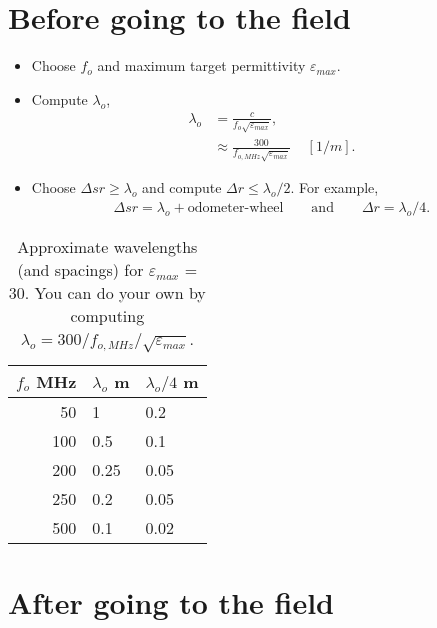 \documentclass[a4paper,12pt]{article}
\begin{document}
\section*{Before going to the field}
\begin{itemize}
\item Choose $f_o$ and maximum target permittivity $\varepsilon_{max}$.
\item Compute $\lambda_o$,
 \begin{align}
\lambda_o &= \frac{c}{f_o\sqrt{\varepsilon_{max}}},\\
 &\approx \frac{300}{f_{o,MHz}\sqrt{\varepsilon_{max}}} \;\;\;\; [1/m].
\end{align}
\item Choose $\Delta sr \geq \lambda_o$ and compute $\Delta r \leq \lambda_o/2$. For example, 
\begin{align*}
\Delta sr=\lambda_o+\text{odometer-wheel}
\hspace{2em} \text{and} \hspace{2em}
\Delta r = \lambda_o/4.
\end{align*}
\end{itemize}
%
\begin{table}[!h]
\centering
\begin{tabular}{ r | l | l}
$f_o$ MHz & $\lambda_o$ m & $\lambda_o/4$ m \\
\hline
50 & 1 & 0.2 \\
100 & 0.5 & 0.1 \\
200 & 0.25 & 0.05 \\
250 & 0.2 & 0.05 \\
500 & 0.1 & 0.02 \\
\hline
\end{tabular}
\caption{Approximate wavelengths (and spacings) for $\varepsilon_{max}$ = 30. You can do your own by computing $\lambda_o=300/f_{o,MHz}/\sqrt{\varepsilon_{max}}$.}
 \label{tbl:wavelength}
\end{table}
\section*{After going to the field}
\end{document}
